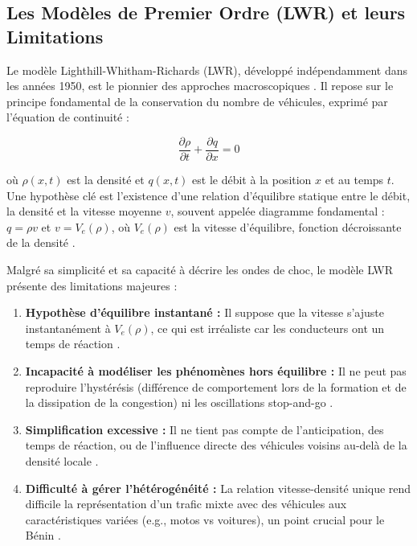 \subsection{Les Modèles de Premier Ordre (LWR) et leurs Limitations}
Le modèle Lighthill-Whitham-Richards (LWR), développé indépendamment dans les années 1950, est le pionnier des approches macroscopiques \cite{LighthillWhitham1955, Richards1956}. Il repose sur le principe fondamental de la conservation du nombre de véhicules, exprimé par l'équation de continuité :

\begin{equation}
\frac{\partial \rho}{\partial t} + \frac{\partial q}{\partial x} = 0
\end{equation}

où $\rho(x, t)$ est la densité et $q(x, t)$ est le débit à la position $x$ et au temps $t$. Une hypothèse clé est l'existence d'une relation d'équilibre statique entre le débit, la densité et la vitesse moyenne $v$, souvent appelée diagramme fondamental : $q = \rho v$ et $v = V_e(\rho)$, où $V_e(\rho)$ est la vitesse d'équilibre, fonction décroissante de la densité \cite{Lebacque1993}.

Malgré sa simplicité et sa capacité à décrire les ondes de choc, le modèle LWR présente des limitations majeures :

\begin{enumerate}
    \item \textbf{Hypothèse d'équilibre instantané :} Il suppose que la vitesse s'ajuste instantanément à $V_e(\rho)$, ce qui est irréaliste car les conducteurs ont un temps de réaction \cite{FanHertySeibold2014}.
    \item \textbf{Incapacité à modéliser les phénomènes hors équilibre :} Il ne peut pas reproduire l'hystérésis (différence de comportement lors de la formation et de la dissipation de la congestion) ni les oscillations stop-and-go \cite{AwKlarMaterneRascle2000}.
    \item \textbf{Simplification excessive :} Il ne tient pas compte de l'anticipation, des temps de réaction, ou de l'influence directe des véhicules voisins au-delà de la densité locale \cite{FanHertySeibold2014}.
    \item \textbf{Difficulté à gérer l'hétérogénéité :} La relation vitesse-densité unique rend difficile la représentation d'un trafic mixte avec des véhicules aux caractéristiques variées (e.g., motos vs voitures), un point crucial pour le Bénin \cite{WongWong2002}.
\end{enumerate}


